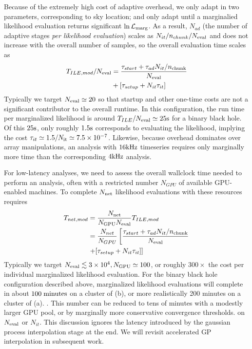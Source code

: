 \documentclass[twocolumn,prd,nofootinbib]{revtex4}
\newcommand\unit[1]{{\rm #1}}
\begin{document}
Because of the extremely high cost of adaptive overhead, we only adapt in two parameters, corresponding to sky location; 
and only adapt until a marginalied likelihood evaluation  returns significant $\ln {\cal L}_{\rm marg}$.  As a result, $N_{ad}$
(the number of adaptive stages \emph{per likelihood evaluation}) scales as $N_{it}/n_{chunk}/N_{\rm eval}$ and does not
increase with the overall number of samples, so the overall evaluation time scales as
\begin{align}
T_{ILE,mod}/N_{\rm eval} &= \frac{\tau_{start} + \tau_{ad}N_{it}/n_{\rm chunk}}{N_{\rm eval}} 
 \nonumber \\ &
 + 
 [ \tau_{setup}  + N_{it}\tau_{it}
 ] 
\end{align}
Typically we target $N_{\rm eval} \simeq 20$ so that startup and other one-time costs  are not a significant contributor to the overall
runtime.   In this configuration, the run time per marginalized likelihood is around $T_{ILE}/N_{\rm eval} \simeq 25
\unit{s}$ for a binary black hole.    Of this $25 \unit{s}$, only roughly
$1.5\unit{s}$ corresponds to evaluating the likelihood, implying the cost $\tau_{it} \simeq 1.5/N_{\rm it} \simeq
7.5\times 10^{-7}$.
Likewise, because overhead dominates over array manipulations, an analysis with  $16\unit{kHz}$ timeseries requires only
marginally more time than the corresponding $4\unit{kHz}$ analysis.


For low-latency analyses, we need to assess the overall wallclock time needed to perform an analysis, often with a
restricted number $N_{GPU}$ of available GPU-enabled machines.   To  complete $N_{\rm net}$ likelihood evaluations
with these resources requires
\begin{align}
T_{net,mod} &= \frac{N_{\rm net}}{N_{\rm GPU} N_{\rm eval}} T_{ILE,mod} \nonumber \\
& =
  \frac{N_{net}}{N_{GPU}}\left[
\frac{\tau_{start} + \tau_{ad}N_{it}/n_{\rm chunk}}{N_{\rm eval}} 
 \right. \nonumber \\
& \left. + 
 [ \tau_{setup}  + N_{it}\tau_{it}
 ] 
 \right]
\end{align}
Typically we target $N_{\rm eval}  \lesssim 3\times 10^4, N_{\rm GPU} \simeq 100$, or roughly $300\times$ the cost per
individual marginalized likelihood evaluation.  For the binary black hole configuration described above, marginalized
likelihood evaluations will complete in about $100\; \unit{minutes}$ on a cluster of (b), or more realistically 200
minutes on a cluster of (a). . This number can be reduced to
tens of minutes with a modestly larger GPU pool, or by  marginally more conservative convergence thresholds. on $N_{\rm
  eval}$ or $N_{it}$.  
This discussion ignores the latency introduced by the  gaussian process interpolation stage at the end.  We will revisit
accelerated GP interpolation in subsequent work.
\end{document}
